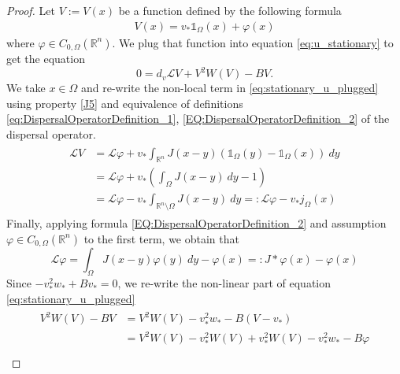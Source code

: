 \documentclass[11pt, a4paper]{article}
\theoremstyle{break}
\theoremstyle{break}
\theoremstyle{break}
\theoremstyle{break}
\theoremstyle{break}
\theoremstyle{break}
\theoremstyle{break}
\begin{document}
\begin{proof}
    Let $V:= V(x)$ be a function defined by the following formula
    \begin{align}
        \label{eq:stationary_u_definition}
        V(x) 
        = 
        v_* \mathds{1}_{\Omega}(x) + \varphi(x)
    \end{align}
    where $\varphi \in C_{0, \Omega}(\mathbb{R}^n)$. We plug that function into equation \eqref{eq:u_stationary} to get the equation
    \begin{equation}
        \label{eq:stationary_u_plugged}
        0 = d_v \mathcal{L} V + V^2 W(V) - B V.
    \end{equation}
    We take $x \in \Omega$ and re-write the non-local term in \eqref{eq:stationary_u_plugged} using property \ref{J5} and equivalence of definitions \eqref{eq:DispersalOperatorDefinition_1}, \eqref{EQ:DispersalOperatorDefinition_2} of the dispersal operator.
    \begin{align}
        \label{eq:non-local-part-u-reformulation}
        \begin{split}
        \mathcal{L}V 
        &=
            \mathcal{L}\varphi + v_*  \int_{\mathbb{R}^n} J(x-y)\left(\mathds{1}_{\Omega}(y) - \mathds{1}_{\Omega}(x)\right)\:dy  \\
            &= \mathcal{L}\varphi + v_* \left( \int_\Omega J(x-y)\:dy - 1 \right) \\
            &= \mathcal{L}\varphi - v_*  \int_{\mathbb{R}^n \setminus \Omega} J(x-y)\:dy =: \mathcal{L}\varphi - v_* j_\Omega(x)
        \end{split}
    \end{align}
    Finally, applying formula \eqref{EQ:DispersalOperatorDefinition_2} and assumption $\varphi \in C_{0, \Omega}(\mathbb{R}^n)$ to the first term, we obtain that
    \begin{equation}
        \label{eq:non-local-part-u-stationary-plugged}
        \mathcal{L}\varphi =  \int_{\Omega} J(x-y) \varphi(y)\:dy - \varphi(x) =: J *\varphi(x) - \varphi(x)
    \end{equation}
    Since $-v_*^2w_* + Bv_*=0$, we re-write the non-linear part of equation \eqref{eq:stationary_u_plugged}
    \begin{align}
        \label{eq:non-linear-part-u-stationary-plugged}
        \begin{split}
            V^2 W(V) - B V 
            &= V^2 W(V) - v_*^2 w_* - B (V - v_*) \\
            &= V^2 W(V) - v_*^2 W(V) + v_*^2 W(V) - v_*^2 w_* - B \varphi  \\

\end{split}
\end{align}
\end{proof}
\end{document}
